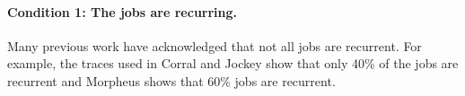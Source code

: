 
\paragraph{Condition 1: The jobs are recurring.}
Many previous work have acknowledged that not all jobs are
recurrent. For example,
the traces used in Corral \cite{corral} and Jockey
\cite{jockey:eurosys2012} show that only 40\% of the jobs are recurrent and
Morpheus \cite{morpheus} shows that 60\% jobs are recurrent.


